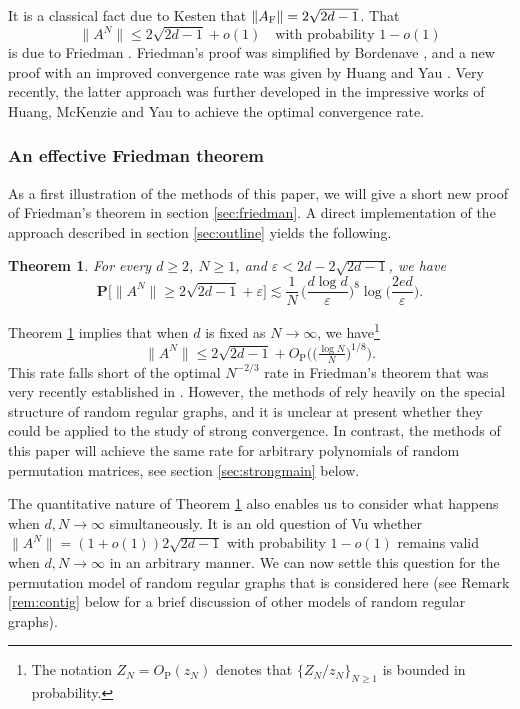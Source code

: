 \documentclass[10pt,reqno]{amsart}
\newtheorem{thm}{Theorem}[section]
\theoremstyle{definition}
\theoremstyle{remark}
\numberwithin{equation}{section}
\numberwithin{figure}{section}
\numberwithin{table}{section}
\newcommand{\Opr}{O_\mathrm{P}}
\begin{document}
It is a classical fact due to 
Kesten \cite{Kes59} that $\|A_{\rm F}\|=2\sqrt{2d-1}$. That
$$
	\|A^N\| \le 2\sqrt{2d-1} + o(1)\quad\text{with probability }
	1-o(1)
$$
is due to Friedman \cite{Fri08}. Friedman's proof was simplified by 
Bordenave \cite{Bor20}, and a new proof with an improved convergence
rate was given by Huang and Yau \cite{HY24}. Very recently, the latter 
approach was further developed in the impressive works of Huang, McKenzie 
and Yau \cite{HMY24,HMY25} to achieve the optimal convergence rate.

\subsubsection{An effective Friedman theorem}

As a first illustration of the methods of this paper, we will give a 
short new proof of Friedman's theorem in section \ref{sec:friedman}.
A direct implementation of the approach described in
section \ref{sec:outline} yields the following.

\begin{thm}
\label{thm:friedman} 
For every $d\ge 2$, $N\ge 1$, and 
$\varepsilon < 2d-2\sqrt{2d-1}$,  we have
$$
	\mathbf{P}\big[\|A^N\|\ge 2\sqrt{2d-1}+\varepsilon\big]
	\lesssim
	\frac{1}{N}\, 
	\bigg(\frac{d\log d}{\varepsilon}\bigg)^{8}
	\log\bigg(\frac{2ed}{\varepsilon}\bigg).
$$
\end{thm}

Theorem \ref{thm:friedman} implies that
when $d$ is fixed as $N\to\infty$, we have\footnote{%
The notation $Z_N=\Opr(z_N)$ denotes that $\{Z_N/z_N\}_{N\ge 1}$ is 
bounded in probability.}
$$
	\|A^N\| \le 2\sqrt{2d-1} + 
	\Opr\big(\big(\tfrac{\log N}{N}\big)^{1/8}\big).
$$
This rate falls short of the optimal $N^{-2/3}$ rate in Friedman's theorem 
that was very recently established in \cite{HMY24,HMY25}. However, the 
methods of \cite{HY24,HMY24,HMY25} rely heavily on the special structure 
of random regular graphs, and it is unclear at present whether they could 
be applied to the study of strong convergence. In contrast, the methods of 
this paper will achieve the same rate for arbitrary polynomials of random 
permutation matrices, see section \ref{sec:strongmain} below.

The quantitative nature of Theorem \ref{thm:friedman} also enables us to 
consider what happens when $d,N\to\infty$ simultaneously. It is an old 
question of Vu \cite[\S 5]{Vu08} whether $\|A^N\|= (1+o(1))2\sqrt{2d-1}$ 
with probability $1-o(1)$ remains valid when $d,N\to\infty$ in an 
arbitrary manner. We can now settle this question for the permutation 
model of random regular graphs that is considered here (see Remark 
\ref{rem:contig} below for a brief discussion of other models of random 
regular graphs).
\end{document}
